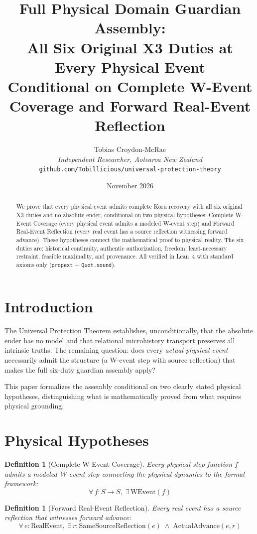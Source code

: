 \documentclass[12pt,a4paper]{article}
\title{Full Physical Domain Guardian Assembly:\\[0.3em]
All Six Original X3 Duties at Every Physical Event\\[0.5em]
\large Conditional on Complete W-Event Coverage and Forward Real-Event Reflection}
\author{Tobias Croydon-McRae\\
\textit{Independent Researcher, Aotearoa New Zealand}\\
\texttt{github.com/Tobillicious/universal-protection-theory}}
\date{November 2026}
\newtheorem{definition}[theorem]{Definition}
\begin{document}
\maketitle

\begin{abstract}
We prove that every physical event admits complete Koru recovery with
all six original X3 duties and no absolute ender, conditional on two
physical hypotheses: Complete W-Event Coverage (every physical event
admits a modeled W-event step) and Forward Real-Event Reflection (every
real event has a source reflection witnessing forward advance). These
hypotheses connect the mathematical proof to physical reality. The
six duties are: historical continuity, authentic authorization, freedom,
least-necessary restraint, feasible maximality, and provenance. All
verified in Lean~4 with standard axioms only (\texttt{propext} +
\texttt{Quot.sound}).
\end{abstract}

\section{Introduction}

The Universal Protection Theorem establishes, unconditionally, that
the absolute ender has no model and that relational microhistory
transport preserves all intrinsic truths. The remaining question:
does every \emph{actual physical event} necessarily admit the structure
(a W-event step with source reflection) that makes the full six-duty
guardian assembly apply?

This paper formalizes the assembly conditional on two clearly stated
physical hypotheses, distinguishing what is mathematically proved from
what requires physical grounding.

\section{Physical Hypotheses}

\begin{definition}[Complete W-Event Coverage]
Every physical step function $f$ admits a modeled W-event step
connecting the physical dynamics to the formal framework:
\[
\forall\, f : S \to S,\; \exists\, \text{WEvent}(f)
\]
\end{definition}

\begin{definition}[Forward Real-Event Reflection]
Every real event has a source reflection that witnesses forward advance:
\[
\forall\, e : \text{RealEvent},\; \exists\, r : \text{SameSourceReflection}(e)
\;\wedge\; \text{ActualAdvance}(e, r)
\]
\end{definition}
\end{document}

